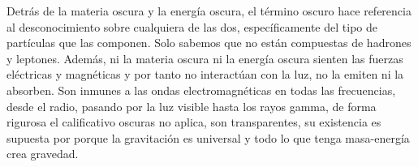 Detrás de la materia oscura y la energía oscura, el término oscuro hace referencia al desconocimiento sobre cualquiera de las dos, específicamente del tipo de partículas que las componen. Solo sabemos que no están compuestas de hadrones y leptones. Además, ni la materia oscura ni la energía oscura sienten las fuerzas eléctricas y magnéticas y por tanto no interactúan con la luz, no la emiten ni la absorben. Son inmunes a las ondas electromagnéticas en todas las frecuencias, desde el radio, pasando por la luz visible hasta los rayos gamma, de forma rigurosa el calificativo oscuras no aplica, son transparentes, su existencia es supuesta por porque la gravitación es universal y todo lo que tenga masa-energía crea gravedad.